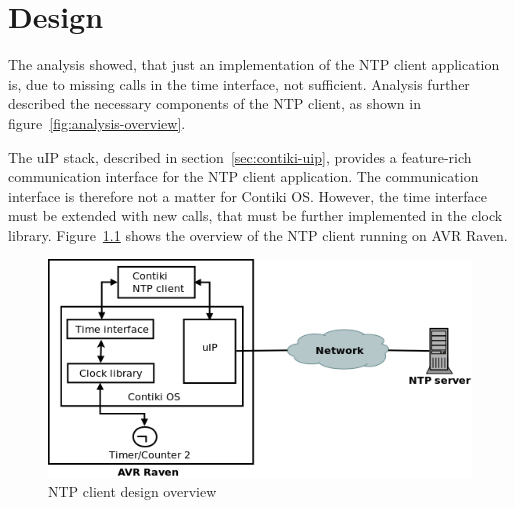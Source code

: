 
\chapter{Design}
The analysis showed, that just an implementation of the
NTP client application is, due to missing calls in the time interface, not sufficient.
Analysis further described the necessary components of the NTP client,
as shown in figure~\ref{fig:analysis-overview}.

The uIP stack, described in section~\ref{sec:contiki-uip}, provides a feature-rich
communication interface for the NTP client application.
The communication interface is therefore not a matter for Contiki OS.
However, the time interface must be extended with new calls,
that must be further implemented in the clock library.
Figure~\ref{fig:design-overview} shows the overview of the NTP client running on AVR Raven.

\begin{figure}[H]
  \centering
  \includegraphics[width=13cm,keepaspectratio]{fig/design.png}
  \caption{NTP client design overview}
  \label{fig:design-overview}
\end{figure}






